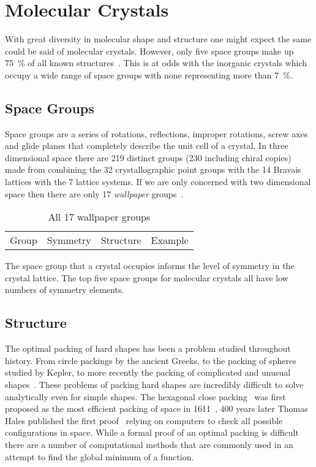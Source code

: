 \section{Molecular Crystals}

With great diversity in molecular shape and structure one might expect the same could be said of molecular crystals. However, only five space groups make up \SI{75}{\percent} of all known structures~\cite{brock:94}. This is at odds with the inorganic crystals which occupy a wide range of space groups with none representing more than \SI{7}{\percent}.

\subsection{Space Groups}

Space groups are a series of rotations, reflections, improper rotations, screw axes and glide planes that completely describe the unit cell of a crystal. In three dimensional space there are 219 distinct groups (230 including chiral copies) made from combining the 32 crystallographic point groups with the 14 Bravais lattices with the 7 lattice systems. If we are only concerned with two dimensional space then there are only 17 {\em wallpaper} groups~.

\begin{table}
    \begin{tabular}{ l l l l }
        Group & Symmetry & Structure & Example \\
    \end{tabular}
    \caption{All 17 wallpaper groups}
    \label{tab:wallpaper}
\end{table}

The space group that a crystal occupies informs the level of symmetry in the crystal lattice. The top five space groups for molecular crystals all have low numbers of symmetry elements.

\subsection{Structure}

The optimal packing of hard shapes has been a problem studied throughout history. From circle packings by the ancient Greeks, to the packing of spheres studied by Kepler, to more recently the packing of complicated and unusual shapes~\cite{atkinson:12,torquato:12}. These problems of packing hard shapes are incredibly difficult to solve analytically even for simple shapes. The hexagonal close packing~ was first proposed as the most efficient packing of space in 1611~\cite{kepler:1611}, 400 years later Thomas Hales published the first proof~\cite{hales:05,hales:14} relying on computers to check all possible configurations in space. While a formal proof of an optimal packing is difficult there are a number of computational methods that are commonly used in an attempt to find the global minimum of a function.


